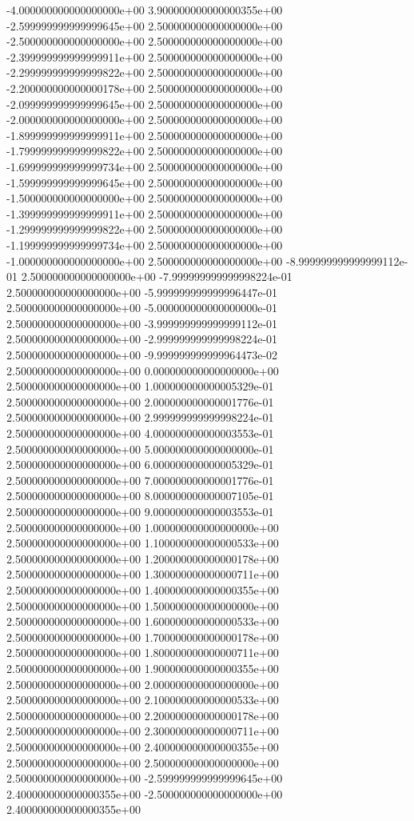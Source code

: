 -4.000000000000000000e+00 3.900000000000000355e+00
-2.599999999999999645e+00 2.500000000000000000e+00
-2.500000000000000000e+00 2.500000000000000000e+00
-2.399999999999999911e+00 2.500000000000000000e+00
-2.299999999999999822e+00 2.500000000000000000e+00
-2.200000000000000178e+00 2.500000000000000000e+00
-2.099999999999999645e+00 2.500000000000000000e+00
-2.000000000000000000e+00 2.500000000000000000e+00
-1.899999999999999911e+00 2.500000000000000000e+00
-1.799999999999999822e+00 2.500000000000000000e+00
-1.699999999999999734e+00 2.500000000000000000e+00
-1.599999999999999645e+00 2.500000000000000000e+00
-1.500000000000000000e+00 2.500000000000000000e+00
-1.399999999999999911e+00 2.500000000000000000e+00
-1.299999999999999822e+00 2.500000000000000000e+00
-1.199999999999999734e+00 2.500000000000000000e+00
-1.000000000000000000e+00 2.500000000000000000e+00
-8.999999999999999112e-01 2.500000000000000000e+00
-7.999999999999998224e-01 2.500000000000000000e+00
-5.999999999999996447e-01 2.500000000000000000e+00
-5.000000000000000000e-01 2.500000000000000000e+00
-3.999999999999999112e-01 2.500000000000000000e+00
-2.999999999999998224e-01 2.500000000000000000e+00
-9.999999999999964473e-02 2.500000000000000000e+00
0.000000000000000000e+00 2.500000000000000000e+00
1.000000000000005329e-01 2.500000000000000000e+00
2.000000000000001776e-01 2.500000000000000000e+00
2.999999999999998224e-01 2.500000000000000000e+00
4.000000000000003553e-01 2.500000000000000000e+00
5.000000000000000000e-01 2.500000000000000000e+00
6.000000000000005329e-01 2.500000000000000000e+00
7.000000000000001776e-01 2.500000000000000000e+00
8.000000000000007105e-01 2.500000000000000000e+00
9.000000000000003553e-01 2.500000000000000000e+00
1.000000000000000000e+00 2.500000000000000000e+00
1.100000000000000533e+00 2.500000000000000000e+00
1.200000000000000178e+00 2.500000000000000000e+00
1.300000000000000711e+00 2.500000000000000000e+00
1.400000000000000355e+00 2.500000000000000000e+00
1.500000000000000000e+00 2.500000000000000000e+00
1.600000000000000533e+00 2.500000000000000000e+00
1.700000000000000178e+00 2.500000000000000000e+00
1.800000000000000711e+00 2.500000000000000000e+00
1.900000000000000355e+00 2.500000000000000000e+00
2.000000000000000000e+00 2.500000000000000000e+00
2.100000000000000533e+00 2.500000000000000000e+00
2.200000000000000178e+00 2.500000000000000000e+00
2.300000000000000711e+00 2.500000000000000000e+00
2.400000000000000355e+00 2.500000000000000000e+00
2.500000000000000000e+00 2.500000000000000000e+00
-2.599999999999999645e+00 2.400000000000000355e+00
-2.500000000000000000e+00 2.400000000000000355e+00
